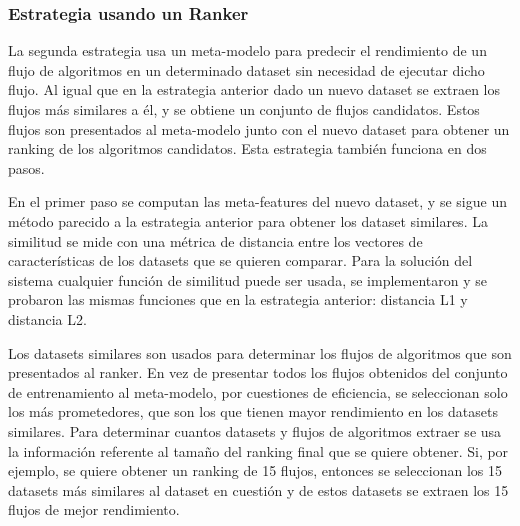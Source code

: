 \subsubsection{Estrategia usando un Ranker}


La segunda estrategia usa un meta-modelo para predecir el rendimiento de un flujo de algoritmos en un determinado dataset sin necesidad de ejecutar dicho flujo. Al igual que en la estrategia anterior dado un nuevo dataset se extraen los flujos más similares a él, y se obtiene un conjunto de flujos candidatos. Estos flujos son presentados al meta-modelo junto con el nuevo dataset para obtener un ranking de los algoritmos candidatos. Esta estrategia también funciona en dos pasos.

En el primer paso se computan las meta-features del nuevo dataset, y se sigue un método parecido a la estrategia anterior para obtener los dataset similares. La similitud se mide con una métrica de distancia entre los vectores de características de los datasets que se quieren comparar. Para la solución del sistema cualquier función de similitud puede ser usada, se implementaron y se probaron las mismas funciones que en la estrategia anterior: distancia L1 y distancia L2.

Los datasets similares son usados para determinar los flujos de algoritmos que son presentados al ranker. En vez de presentar todos los flujos obtenidos del conjunto de entrenamiento al meta-modelo, por cuestiones de eficiencia, se seleccionan solo los más prometedores, que son los que tienen mayor rendimiento en los datasets similares. Para determinar cuantos datasets y flujos de algoritmos extraer se usa la información referente al tamaño del ranking final que se quiere obtener. Si, por ejemplo, se quiere obtener un ranking de 15 flujos, entonces se seleccionan los 15 datasets más similares al dataset en cuestión y de estos datasets se extraen los 15 flujos de mejor rendimiento. 

